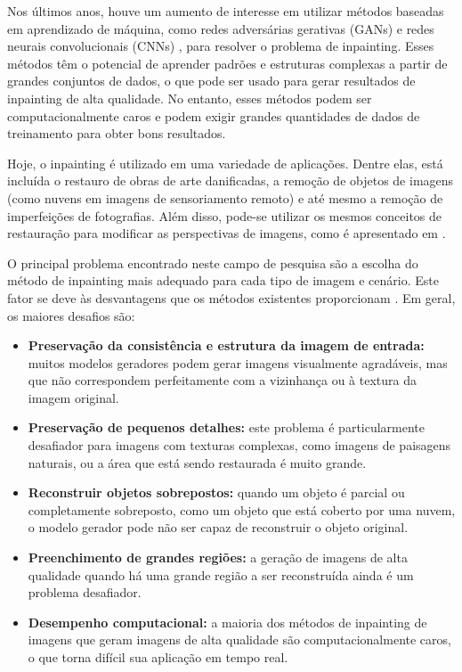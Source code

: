 Nos últimos anos, houve um aumento de interesse em utilizar métodos baseadas em aprendizado de máquina, como redes adversárias gerativas (GANs) e redes neurais convolucionais (CNNs) \cite{pathakCVPR16context}, para resolver o problema de inpainting. Esses métodos têm o potencial de aprender padrões e estruturas complexas a partir de grandes conjuntos de dados, o que pode ser usado para gerar resultados de inpainting de alta qualidade. No entanto, esses métodos podem ser computacionalmente caros e podem exigir grandes quantidades de dados de treinamento para obter bons resultados.

Hoje, o inpainting é utilizado em uma variedade de aplicações. Dentre elas, está incluída o restauro de obras de arte danificadas, a remoção de objetos de imagens (como nuvens em imagens de sensoriamento remoto) e até mesmo a
remoção de imperfeições de fotografias. Além disso, pode-se utilizar os mesmos conceitos de restauração para modificar as perspectivas de imagens, como é apresentado em \cite{huang2014image}.

O principal problema encontrado neste campo de pesquisa são a escolha do método de inpainting mais adequado para cada tipo de imagem e cenário. Este fator se deve às desvantagens que os métodos existentes proporcionam \cite{Salem2021}. Em geral, os maiores desafios são:
\begin{itemize}
  \item \textbf{Preservação da consistência e estrutura da imagem de entrada:} muitos modelos geradores podem gerar imagens visualmente agradáveis, mas que não correspondem perfeitamente com a vizinhança ou à textura da imagem original.
  \item \textbf{Preservação de pequenos detalhes:} este problema é particularmente desafiador para imagens com texturas complexas, como imagens de paisagens naturais, ou a área que está sendo restaurada é muito grande.
  \item \textbf{Reconstruir objetos sobrepostos:} quando um objeto é parcial ou completamente sobreposto, como um objeto que está coberto por uma nuvem, o modelo gerador pode não ser capaz de reconstruir o objeto original.
  \item \textbf{Preenchimento de grandes regiões:} a geração de imagens de alta qualidade quando há uma grande região a ser reconstruída ainda é um problema desafiador.
  \item \textbf{Desempenho computacional:} a maioria dos métodos de inpainting de imagens que geram imagens de alta qualidade são computacionalmente caros, o que torna difícil sua aplicação em tempo real.
\end{itemize}

